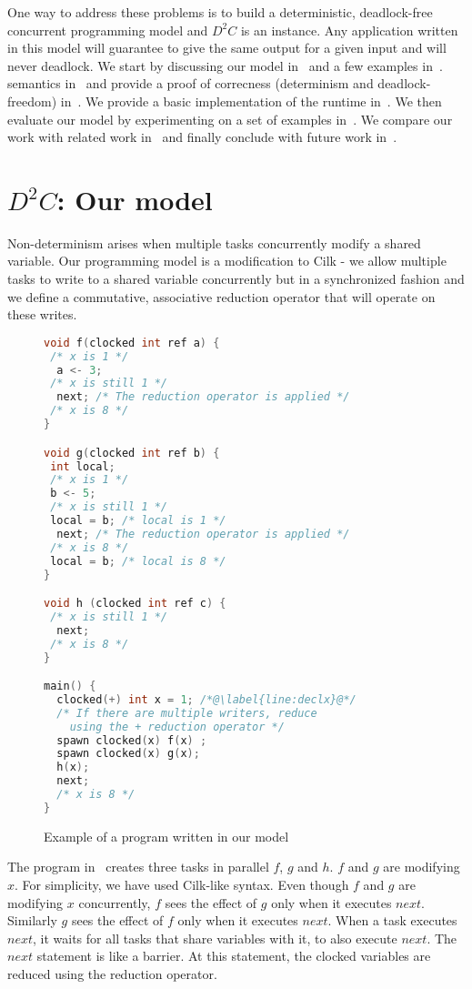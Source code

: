 \documentclass[10pt, conference, compsocconf]{IEEEtran}
\begin{document}
One way to address these problems is to build a deterministic, deadlock-free concurrent programming
model and $D^2C$ is an instance. 
Any application written in this model will guarantee to give 
the same output for a given input
and will never deadlock. We start by discussing our model in~ and a few examples in~. 
 semantics in~ and provide a proof of correcness (determinism and deadlock-freedom) in~. 
We provide a basic implementation of the runtime in~. 
We then evaluate our model by experimenting on a set of examples in~. 
We compare our work with related work in~ and finally conclude with future work in~.



\section{$D^2C$: Our model}
\label{sec:model}

Non-determinism arises when multiple tasks concurrently modify a shared variable.
Our programming model is a modification to Cilk - we allow multiple tasks to write to
a shared variable concurrently but in a synchronized fashion and we define a commutative, associative
reduction operator that will operate on these
writes.
\begin{figure}
\begin{lstlisting}[language=C]
void f(clocked int ref a) {
 /* x is 1 */
  a <- 3;
 /* x is still 1 */
  next; /* The reduction operator is applied */
 /* x is 8 */
}

void g(clocked int ref b) {
 int local;
 /* x is 1 */
 b <- 5;
 /* x is still 1 */
 local = b; /* local is 1 */
  next; /* The reduction operator is applied */
 /* x is 8 */
 local = b; /* local is 8 */
}

void h (clocked int ref c) {
 /* x is still 1 */
  next;
 /* x is 8 */
}

main() {
  clocked(+) int x = 1; /*@\label{line:declx}@*/
  /* If there are multiple writers, reduce
    using the + reduction operator */
  spawn clocked(x) f(x) ;
  spawn clocked(x) g(x);
  h(x);
  next;
  /* x is 8 */
}
\end{lstlisting}
\caption{Example of a program written in our model}
\label{fig:ddc}
\end{figure}


The program in~ creates three tasks
in parallel $f$, $g$ and $h$. $f$ and $g$ are
modifying $x$.
For simplicity, we have used Cilk\cite{blumofe1995cilk}-like syntax.
Even though $f$ and $g$ are modifying
$x$ concurrently, $f$ sees the effect of $g$ only
when it executes $next$. Similarly $g$ sees the effect
of $f$ only when it executes $next$.
When a task executes $next$, it waits for all tasks that
share variables with it, to also execute $next$. The $next$
statement is like a barrier. At this statement, the clocked variables are reduced
using the reduction operator.
\end{document}
